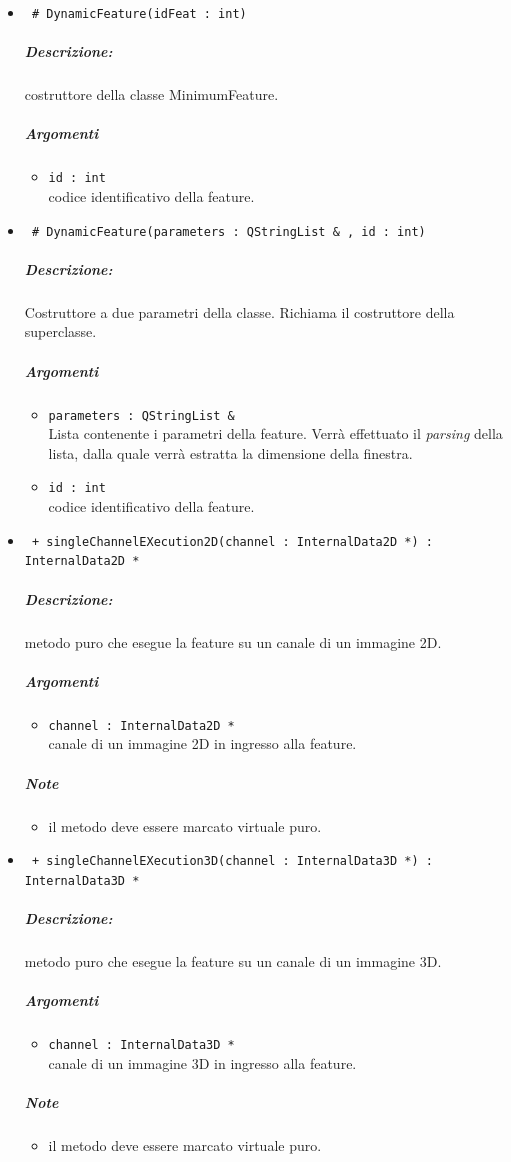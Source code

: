 	\begin{itemize}
	\item \color{blue}\verb! # DynamicFeature(idFeat : int)!
		\color{black}
		\subparagraph{Descrizione:} costruttore della classe MinimumFeature.
		\subparagraph{Argomenti}
			\begin{itemize}
				\item \color{RoyalPurple} \verb!id : int! \\ 
				\color{black} codice identificativo della feature\g{}.	
			\end{itemize}
			
	\item \color{blue}\verb! # DynamicFeature(parameters : QStringList & , id : int)!
		\color{black}
		\subparagraph{Descrizione:} Costruttore a due parametri della classe. Richiama il costruttore della 						superclasse.
		\subparagraph{Argomenti}
			\begin{itemize}	
				\item \color{RoyalPurple} \verb!parameters : QStringList &! \\ 
				\color{black} Lista contenente i parametri della feature\g{}. Verrà effettuato il \textit{parsing} 						della lista, dalla quale verrà estratta la dimensione della finestra.
				\item \color{RoyalPurple} \verb!id : int! \\ 
				\color{black} codice identificativo della feature\g{}.	
			\end{itemize}

	\item \color{blue}\verb! + singleChannelEXecution2D(channel : InternalData2D *) : InternalData2D *!
		\color{black}
		\subparagraph{Descrizione:} metodo puro che esegue la feature su un canale di un immagine 2D.
		\subparagraph{Argomenti}
			\begin{itemize}
				\item \color{RoyalPurple} \verb!channel : InternalData2D * ! \\ 
				\color{black} canale di un immagine 2D in ingresso alla feature.		
			\end{itemize}
		\subparagraph{Note}
			\begin{itemize}
				\item il metodo deve essere marcato virtuale puro.
			\end{itemize}
			
	\item \color{blue}\verb! + singleChannelEXecution3D(channel : InternalData3D *) : InternalData3D *!
		\color{black}
		\subparagraph{Descrizione:} metodo puro che esegue la feature su un canale di un immagine 3D.
		\subparagraph{Argomenti}
			\begin{itemize}
				\item \color{RoyalPurple} \verb!channel : InternalData3D * ! \\ 
				\color{black} canale di un immagine 3D in ingresso alla feature.		
			\end{itemize}
		\subparagraph{Note}
			\begin{itemize}
				\item il metodo deve essere marcato virtuale puro.
			\end{itemize}
			

\end{itemize}
